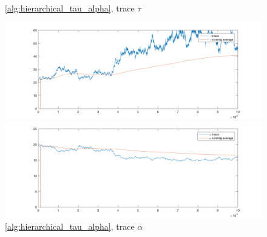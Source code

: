 \documentclass{siamart1116}
\begin{document}
\begin{figure}[!htb]
    \begin{minipage}{0.48\textwidth}
        \centering
        \caption{\label{fig:moon_centered_tau} \cref{alg:hierarchical_tau_alpha}, trace $\tau$}
        \includegraphics[width=\linewidth]{graphics/moons/centered/trace_tau.png}
    \end{minipage} \hfill
    \begin{minipage}{0.48\textwidth}
        \centering
        \caption{\label{fig:moon_centered_alpha} \cref{alg:hierarchical_tau_alpha}, trace $\alpha$}
        \includegraphics[width=\linewidth]{graphics/moons/centered/trace_alpha.png}
    \end{minipage}
\end{figure}
\end{document}
